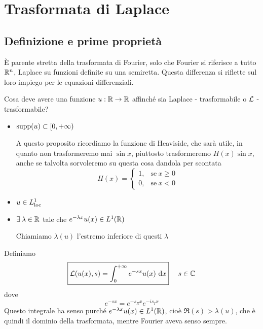 


\chapter{Trasformata di Laplace} 

\section{Definizione e prime proprietà}

È parente stretta della trasformata di Fourier, solo che Fourier si riferisce a tutto $\mathbb{R}^{n}$, Laplace su funzioni definite su una semiretta. Questa differenza si riflette sul loro impiego per le equazioni differenziali.

Cosa deve avere una funzione $u: \mathbb{R}\rightarrow \mathbb{R}$ affinché sia Laplace - trasformabile o $\mathcal{L}$ - trasformabile?
\begin{itemize}
\item $\operatorname*{supp}(u) \subset [0, + \infty)$

A questo proposito ricordiamo la funzione di Heaviside, che sarà utile, in quanto non trasformeremo mai $\sin x$, piuttosto trasformeremo $H(x)\sin x$, anche se talvolta sorvoleremo su questa cosa dandola per scontata
\begin{equation*}
H(x) =
\begin{cases}
1, & \text{se} \ x \geq 0\\
0, & \text{se} \ x < 0
\end{cases}
\end{equation*}
\item $u\in L^{1}_{\operatorname{loc}}$
\item $\exists \lambda \in \RR$ tale che $e^{- \lambda x} u(x) \in L^{1}(\mathbb{R})$

Chiamiamo $\lambda (u)$ l'estremo inferiore di questi $\lambda $
\end{itemize}
\begin{defn}
Definiamo
\begin{equation*}
\boxed{\mathcal{L}(u(x), s) = \int^{+ \infty}_{0} e^{- sx} u(x) \  \mathrm{d} x} \ \ \ \ s\in \mathbb{C}
\end{equation*}
dove
\begin{equation*}
e^{- sx} = e^{- s_{R} x} e^{- is_{I} x}
\end{equation*}
Questo integrale ha senso purché $e^{- \lambda x} u(x) \in L^{1}(\mathbb{R})$, cioè $\Re (s) > \lambda (u)$, che è quindi il dominio della trasformata, mentre Fourier aveva senso sempre.
\end{defn}
